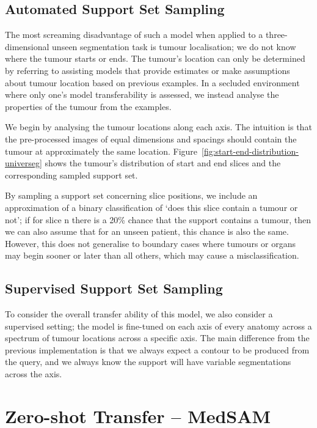 \documentclass[12pt,twoside]{report}
\begin{document}
\subsection{Automated Support Set Sampling}

The most screaming disadvantage of such a model when applied to a three-dimensional unseen segmentation task is tumour localisation; we do not know where the tumour starts or ends. The tumour's location can only be determined by referring to assisting models that provide estimates or make assumptions about tumour location based on previous examples. In a secluded environment where only one's model transferability is assessed, we instead analyse the properties of the tumour from the examples.

We begin by analysing the tumour locations along each axis. The intuition is that the pre-processed images of equal dimensions and spacings should contain the tumour at approximately the same location. Figure~\ref{fig:start-end-distribution-universeg} shows the tumour's distribution of start and end slices and the corresponding sampled support set.

By sampling a support set concerning slice positions, we include an approximation of a binary classification of `does this slice contain a tumour or not'; if for slice n there is a 20\% chance that the support contains a tumour, then we can also assume that for an unseen patient, this chance is also the same. However, this does not generalise to boundary cases where tumours or organs may begin sooner or later than all others, which may cause a misclassification.

\subsection{Supervised Support Set Sampling}

To consider the overall transfer ability of this model, we also consider a supervised setting; the model is fine-tuned on each axis of every anatomy across a spectrum of tumour locations across a specific axis. The main difference from the previous implementation is that we always expect a contour to be produced from the query, and we always know the support will have variable segmentations across the axis.

\section{Zero-shot Transfer -- MedSAM}
\end{document}
